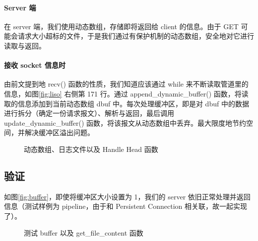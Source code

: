 \paragraph*{Server 端} 在 server 端，我们使用动态数组，存储即将返回给 client 的信息。由于 GET 可能会请求大小超标的文件，于是我们通过有保护机制的动态数组，安全地对它进行读取与返回。

\paragraph*{接收 socket 信息时} 由前文提到地 recv() 函数的性质，我们知道应该通过 while 来不断读取管道里的信息，如图\ref{fig:liso} 右侧第 171 行。通过 append\_dynamic\_buffer() 函数，将读取的信息添加到当前动态数组 dbuf 中。每次处理缓冲区，即是对 dbuf 中的数据进行拆分（确定一份请求报文）、解析与返回，最后调用 update\_dynamic\_buffer() 函数，将该报文从动态数组中丢弃。最大限度地节约空间，并解决缓冲区溢出问题。
\begin{figure}[htbp!]
    \centering
    \caption{动态数组、日志文件以及 Handle Head 函数}\label{fig:Chapter2}
\end{figure}


\subsection*{验证}
如图\ref{fig:buffer}，即使将缓冲区大小设置为 1，我们的 server 依旧正常处理并返回信息（测试样例为 pipeline，由于和 Persistent Connection 相关联，故一起实现了）。


\begin{figure}[htbp!]
    \centering
    \subfigure[buffer\_test,BUF\_SIZE=1]{\label{fig:buffer}\texttt{[image: BUF=1.png]}}
    \caption{测试 buffer 以及 get\_file\_content 函数}\label{fig:Chapter2.2}
\end{figure}

